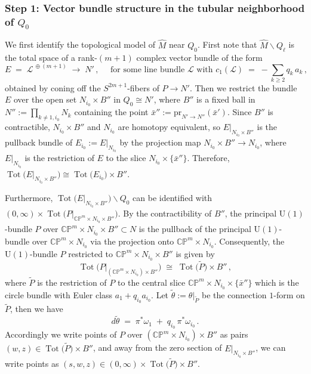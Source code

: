 \documentclass[11pt]{amsart}
\theoremstyle{plain}
\numberwithin{equation}{section}
\theoremstyle{definition}
\theoremstyle{remark}
\begin{document}
\subsubsection{Step 1: Vector bundle structure in the tubular neighborhood of $Q_0$}
We first identify the topological model of $\widehat{M}$ near $Q_0$. First note that $\widehat{M} \backslash Q_{\ell}$ is the total space of a rank-$(m+1)$ complex vector bundle of the form
\begin{equation*}
E \;=\; \mathcal{L}^{\, \oplus ( m + 1 )} \;\longrightarrow\; N' \,, \quad \text{ for some line bundle $\mathcal{L}$ with } c_1 ( \mathcal{L} ) \;=\; - \sum_{k \geq 2} q_k \, a_k \,,
\end{equation*}
obtained by coning off the $S^{2m+1}$-fibers of $P \to N'$. Then we restrict the bundle $E$ over the open set $N_{i_0} \times B''$ in $Q_0 \cong N'$, where $B''$ is a fixed ball in $N'' := \prod_{k\not=1,i_0}N_k$ containing the point $\bar{x}'' := \textrm{pr}_{N' \to N''}(\bar{x}')$. Since $B''$ is contractible, $N_{i_0} \times B''$ and $N_{i_0}$ are homotopy equivalent, so $E|_{N_{i_0} \times B''}$ is the pullback bundle of $E_{i_0} := E |_{N_{i_0}}$ by the projection map $N_{i_0} \times B'' \to N_{i_0}$, where $E|_{N_{i_0}}$ is the restriction of $E$ to the slice $N_{i_0} \times \{\bar{x}''\}$. Therefore, $\operatorname{Tot}\big(E|_{N_{i_0} \times B''}\big) \cong \operatorname{Tot}\big(E_{i_0}\big) \times B''$.




Furthermore, $\operatorname{Tot}\big(E\big|_{N_{i_0}\times B''}\big) \backslash Q_0$ can be identified with $(0,\infty) \times \operatorname{Tot}\big(P\big|_{\mathbb{CP}^m \times N_{i_0}\times B''}\big)$. By the contractibility of $B''$, the principal $\mathrm{U}(1)$-bundle $P$ over $\mathbb{CP}^m \times N_{i_0} \times B'' \subset N$ is the pullback of the principal $\mathrm{U}(1)$-bundle over $\mathbb{CP}^m \times N_{i_0}$ via the projection onto $\mathbb{CP}^m \times N_{i_0}$. Consequently, the $\mathrm{U}(1)$-bundle $P$ restricted to $\mathbb{CP}^m \times N_{i_0} \times B''$ is given by
\begin{equation*}
\operatorname{Tot}\big(P \big|_{( \mathbb{CP}^m \times N_{i_0} ) \times B''}\big) \;\cong\; \operatorname{Tot}\big(\widetilde{P}\big) \times B'' \,,
\end{equation*}
where $\widetilde{P}$ is the restriction of $P$ to the central slice $\mathbb{CP}^m \times N_{i_0} \times \{\bar{x}''\}$ which is the circle bundle with Euler class $a_1 + q_{i_0}a_{i_0}$. Let $\tilde{\theta} := \theta|_{\widetilde{P}}$ be the connection $1$-form on $\widetilde{P}$, then we have
\begin{equation*}
d \widetilde{\theta} \;=\; \pi^*\omega_1 \;+\; q_{i_0} \, \pi^*\omega_{i_0} \,.
\end{equation*}
Accordingly we write points of $P$ over $( \mathbb{CP}^m \times N_{i_0} ) \times B''$ as pairs $( w,z) \in \operatorname{Tot}\big(\widetilde{P}\big) \times B''$, and away from the zero section of $E\big|_{N_{i_0}\times B''}$, we can write points as $(s,w,z) \in (0,\infty) \times \operatorname{Tot}\big(\widetilde{P}\big) \times B''$.
\end{document}
